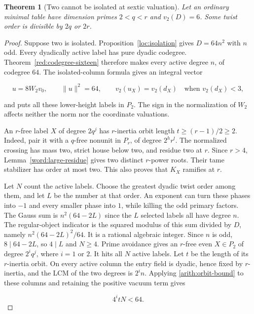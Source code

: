 \documentclass[11pt,a4paper]{article}
\numberwithin{equation}{section}
\newtheorem{theorem}{Theorem}[section]
\begin{document}
\begin{theorem}[Two cannot be isolated at sextic valuation]
\label{red:dyadic-isolation}
Let an ordinary minimal table have dimension primes
$2<q<r$ and $v_2(D)=6$. Some twist order is divisible by $2q$ or $2r$.
\end{theorem}
\begin{proof}
Suppose two is isolated. Proposition~\ref{loc:isolation}
gives $D=64n^2$ with $n$ odd.  Every dyadically active label
has pure dyadic codegree. Theorem~\ref{red:codegree-sixteen}
therefore makes every active degree $n$, of codegree $64$.
The isolated-column formula gives an integral vector

\begin{equation}\label{eq:dyadic-column}
u=8W_2v_0,\qquad \|u\|^2=64,\qquad
 v_2(u_X)=v_2(d_X)\quad\text{when }v_2(d_X)<3,
\end{equation}

and puts all these lower-height labels in \(P_2\).
The sign in the normalization of $W_2$ affects neither the norm
nor the coordinate valuations.

An \(r\)-free label \(X\) of degree \(2q^j\) has
\(r\)-inertia orbit length \(t\ge(r-1)/2\ge2\).
Indeed, pair it with a \(q\)-free nonunit in \(P_r\),
of degree \(2^h r^l\).  The normalized crossing has
mass two, strict house below two, and residue two at \(r\).
Since \(r>4\), Lemma~\ref{word:large-residue} gives two
distinct \(r\)-power roots.  Their tame stabilizer has order
at most two.  This also proves that \(K_X\) ramifies at \(r\).

Let $N$ count the active labels. Choose the greatest dyadic
twist order among them, and let $L$ be the number at that order.
An exponent can turn these phases into $-1$ and every smaller
phase into $1$, while killing the odd primary factors. The
Gauss sum is $n^2(64-2L)$ since the $L$ selected labels
all have degree $n$. The regular-object indicator is the squared
modulus of this sum divided by $D$, namely $n^2(64-2L)^2/64$.
It is a rational algebraic integer. Since $n$ is odd, $8\mid64-2L$,
so $4\mid L$ and $N\ge4$.
Prime avoidance gives an \(r\)-free even \(X\in P_2\)
of degree \(2^i q^j\), where \(i=1\) or \(2\).
It hits all \(N\) active labels.  Let \(t\) be the length
of its $r$-inertia orbit. On every active column the entry field is
dyadic, hence fixed by $r$-inertia, and the LCM of the two degrees is
$2^i n$. Applying \eqref{arith:orbit-bound} to these columns and
retaining the positive vacuum term gives

\begin{equation}\label{eq:dyadic-count}
4^i tN<64.
\end{equation}


\end{proof}
\end{document}
